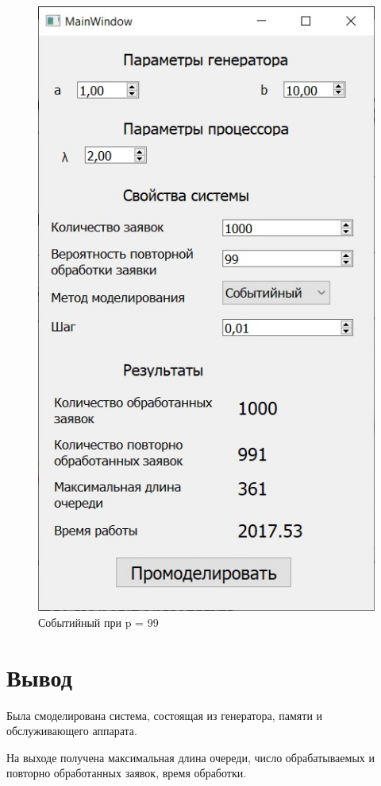 \documentclass[14pt, a4paper]{extarticle}
\begin{document}
\begin{figure}[h!]
	\centering
	\includegraphics[scale=0.6]{source/event99.jpg}
	\caption{Событийный при p = 99}
\end{figure}

\newpage
\section*{Вывод}
Была смоделирована система, состоящая из генератора, памяти и обслуживающего аппарата.

На выходе получена максимальная длина очереди, число обрабатываемых и повторно обработанных заявок, время обработки.
\end{document}
